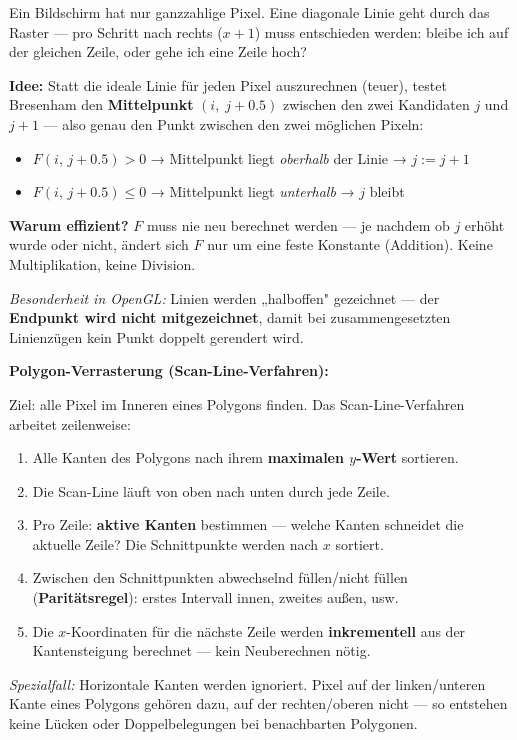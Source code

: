 \documentclass[12pt, a4paper]{article}
\begin{document}
Ein Bildschirm hat nur ganzzahlige Pixel. Eine diagonale Linie geht durch das Raster — pro Schritt nach rechts ($x+1$) muss entschieden werden: bleibe ich auf der gleichen Zeile, oder gehe ich eine Zeile hoch?

\textbf{Idee:} Statt die ideale Linie für jeden Pixel auszurechnen (teuer), testet Bresenham den \textbf{Mittelpunkt} $(i,\; j+0.5)$ zwischen den zwei Kandidaten $j$ und $j+1$ — also genau den Punkt zwischen den zwei möglichen Pixeln:
\begin{itemize}
  \item $F(i,\,j+0.5) > 0$ → Mittelpunkt liegt \textit{oberhalb} der Linie → $j := j+1$
  \item $F(i,\,j+0.5) \leq 0$ → Mittelpunkt liegt \textit{unterhalb} → $j$ bleibt
\end{itemize}

\textbf{Warum effizient?} $F$ muss nie neu berechnet werden — je nachdem ob $j$ erhöht wurde oder nicht, ändert sich $F$ nur um eine feste Konstante (Addition). Keine Multiplikation, keine Division.

\textit{Besonderheit in OpenGL:} Linien werden „halboffen" gezeichnet — der \textbf{Endpunkt wird nicht mitgezeichnet}, damit bei zusammengesetzten Linienzügen kein Punkt doppelt gerendert wird.

\medskip
\textbf{Polygon-Verrasterung (Scan-Line-Verfahren):}

Ziel: alle Pixel im Inneren eines Polygons finden. Das Scan-Line-Verfahren arbeitet zeilenweise:

\begin{enumerate}
  \item Alle Kanten des Polygons nach ihrem \textbf{maximalen $y$-Wert} sortieren.
  \item Die Scan-Line läuft von oben nach unten durch jede Zeile.
  \item Pro Zeile: \textbf{aktive Kanten} bestimmen — welche Kanten schneidet die aktuelle Zeile? Die Schnittpunkte werden nach $x$ sortiert.
  \item Zwischen den Schnittpunkten abwechselnd füllen/nicht füllen (\textbf{Paritätsregel}): erstes Intervall innen, zweites außen, usw.
  \item Die $x$-Koordinaten für die nächste Zeile werden \textbf{inkrementell} aus der Kantensteigung berechnet — kein Neuberechnen nötig.
\end{enumerate}

\textit{Spezialfall:} Horizontale Kanten werden ignoriert. Pixel auf der linken/unteren Kante eines Polygons gehören dazu, auf der rechten/oberen nicht — so entstehen keine Lücken oder Doppelbelegungen bei benachbarten Polygonen.
\end{document}
